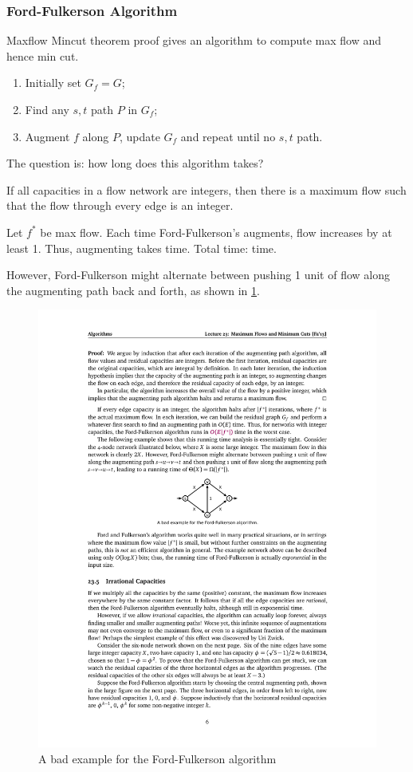 \subsubsection{Ford-Fulkerson Algorithm}
Maxflow Mincut theorem proof gives an algorithm to compute max flow and hence min cut.
\begin{enumerate}
    \item Initially set $G_f = G$;
    \item Find any $s,t$ path $P$ in $G_f$;
    \item Augment $f$ along $P$, update $G_f$ and repeat until no $s,t$ path.
\end{enumerate}
The question is: how long does this algorithm takes?

\begin{theorem}
    If all capacities in a flow network are integers, then there is a maximum
    flow such that the flow through every edge is an integer.
\end{theorem}

\analysis Let $f^*$ be max flow.
Each time Ford-Fulkerson's augments, flow increases by at least 1.
Thus, augmenting takes  time.
Total time:  time.

However, Ford-Fulkerson might alternate between pushing 1 unit of flow
along the augmenting path back and forth, as shown in \cref{fig:ffexample}.
\begin{figure}[H]
    \centering
    \includegraphics[scale=1.2]{fig/ffexample}
    \caption{A bad example for the Ford-Fulkerson algorithm}
    \label{fig:ffexample}
\end{figure}

